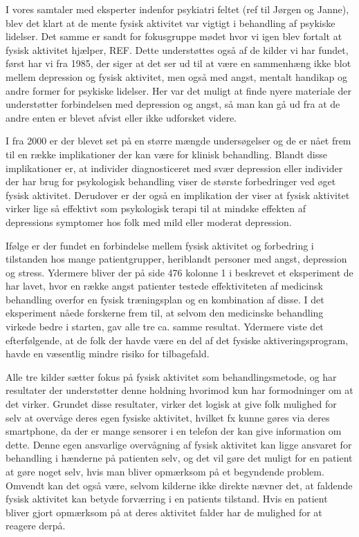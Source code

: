I vores samtaler med eksperter indenfor psykiatri feltet (ref til Jørgen og Janne), blev det klart at de mente fysisk aktivitet var vigtigt i behandling af psykiske lidelser.
Det samme er sandt for fokusgruppe mødet hvor vi igen blev fortalt at fysisk aktivitet hjælper, REF.
Dette understøttes også af de kilder vi har fundet, først har vi \citet{misc:healthReports} fra 1985, der siger at det ser ud til at være en sammenhæng ikke blot mellem depression og fysisk aktivitet, men også med angst, mentalt handikap og andre former for psykiske lidelser.
Her var det muligt at finde nyere materiale der understøtter forbindelsen med depression og angst, så man kan gå ud fra at de andre enten er blevet afvist eller ikke udforsket videre.

I \citet{art:physMental} fra 2000 er der blevet set på en større mængde undersøgelser og de er nået frem til en række implikationer der kan være for klinisk behandling.
Blandt disse implikationer er, at individer diagnosticeret med svær depression eller individer der har brug for psykologisk behandling viser de største forbedringer ved øget fysisk aktivitet.
Derudover er der også en implikation der viser at fysisk aktivitet virker lige så effektivt som psykologisk terapi til at mindske effekten af depressions symptomer hos folk med mild eller moderat depression.

Ifølge \citet{book:sportPsyc} er der fundet en forbindelse mellem fysisk aktivitet og forbedring i tilstanden hos mange patientgrupper, heriblandt personer med angst, depression og stress.
Ydermere bliver der på side 476 kolonne 1 i \citet{book:sportPsyc} beskrevet et eksperiment de har lavet, hvor en række angst patienter testede effektiviteten af medicinsk behandling overfor en fysisk træningsplan og en kombination af disse.
I det eksperiment nåede forskerne frem til, at selvom den medicinske behandling virkede bedre i starten, gav alle tre ca. samme resultat.
Ydermere viste det efterfølgende, at de folk der havde være en del af det fysiske aktiveringsprogram, havde en væsentlig mindre risiko for tilbagefald.

Alle tre kilder sætter fokus på fysisk aktivitet som behandlingsmetode, \citet{art:physMental} og \citet{book:sportPsyc} har resultater der understøtter denne holdning hvorimod \citet{misc:healthReports} kun har formodninger om at det virker.
Grundet disse resultater, virker det logisk at give folk mulighed for selv at overvåge deres egen fysiske aktivitet, hvilket fx kunne gøres via deres smartphone, da der er mange sensorer i en telefon der kan give information om dette.
Denne egen ansvarlige overvågning af fysisk aktivitet kan ligge ansvaret for behandling i hænderne på patienten selv, og det vil gøre det muligt for en patient at gøre noget selv, hvis man bliver opmærksom på et begyndende problem.
Omvendt kan det også være, selvom kilderne ikke direkte nævner det, at faldende fysisk aktivitet kan betyde forværring i en patients tilstand.
Hvis en patient bliver gjort opmærksom på at deres aktivitet falder har de mulighed for at reagere derpå.


